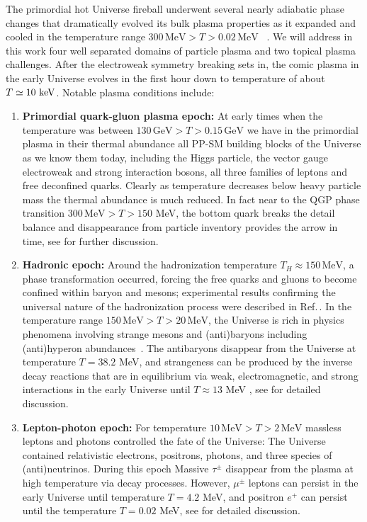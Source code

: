 {The primordial hot Universe fireball underwent several nearly adiabatic phase changes that dramatically evolved its bulk plasma properties as it expanded and cooled in the temperature range $300\,\mathrm{MeV}>T>0.02\,\mathrm{MeV}$ ~\cite{Rafelski:2023emw}. We will address in this work four well separated domains of particle plasma and two topical plasma challenges. After the electroweak symmetry breaking sets in,  the comic plasma in the early Universe evolves in the first hour down to temperature of about $T\simeq 10\text{ keV}$. Notable plasma conditions include:
\begin{enumerate}
\item \textbf{Primordial quark-gluon plasma epoch:}  
At early times when the temperature was between $130\,\mathrm{GeV}>T>0.15\,\mathrm{GeV}$ we have in the primordial plasma in their thermal abundance all PP-SM  building blocks of the Universe as we know them today, including the Higgs particle, the vector gauge electroweak and strong interaction bosons, all three families of leptons and free deconfined quarks. Clearly as temperature decreases below heavy particle mass the thermal abundance is much reduced. In fact near to the QGP phase transition $300\, \mathrm{MeV}>T>150$ MeV, the bottom quark breaks the detail balance and disappearance from particle inventory provides the arrow in time, see  for further discussion. 
%
\item \textbf{Hadronic epoch:}  Around the hadronization temperature $T_H\approx150\,\mathrm{MeV}$, a phase transformation occurred, forcing the free quarks and gluons to become confined within baryon and mesons; experimental results confirming the universal nature of the hadronization process were described in Ref.\,\cite{Letessier:2005qe}. In the temperature range $ 150\,\mathrm{MeV}>T>20\,\mathrm{MeV}$, the Universe is rich in physics phenomena involving strange mesons and (anti)baryons including (anti)hyperon abundances~\cite{Fromerth:2012fe,Yang:2021bko}. The antibaryons disappear from the Universe at temperature $T=38.2$ MeV, and strangeness can be produced by the inverse decay reactions that are in equilibrium via weak, electromagnetic, and strong interactions in the early Universe until $T\approx13$ MeV , see  for detailed discussion.
%
\item \textbf{Lepton-photon epoch:}  For temperature $10\,\mathrm{MeV}>T>2\,\mathrm{MeV}$ massless leptons and photons controlled the fate of the Universe: The Universe contained relativistic electrons, positrons, photons, and three species of (anti)neutrinos. During this epoch Massive $\tau^\pm$ disappear from the plasma at high temperature via decay processes. However, $\mu^\pm$ leptons can persist in the early Universe until temperature $T=4.2$ MeV, and positron $e^+$ can persist until the temperature $T=0.02$ MeV, see  for detailed discussion.


\end{enumerate}}
